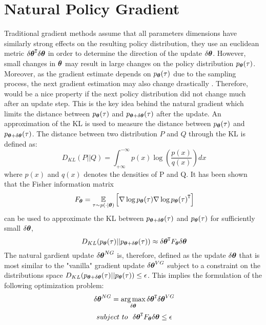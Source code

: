 \section{Natural Policy Gradient}\label{sec:npg}
Traditional gradient methods assume that all parameters dimensions have similarly strong effects on the resulting policy distribution, \ie they use an euclidean metric $\transpose{\delta\vtheta}\delta\vtheta$ in order to determine the direction of the update $\delta\vtheta$. However, small changes in $\vtheta$ may result in large changes on the policy distribution $p_{\vtheta}(\tau)$. Moreover, as the gradient estimate depends on $p_{\vtheta}(\tau)$ due to the sampling process, the next gradient estimation may also change drastically \citep{deisenroth2013survey}. Therefore, would be a nice property if the next policy distribution did not change much after an update step. This is the key idea behind the natural gradient which limits the distance between $p_{\vtheta}(\tau)$ and $p_{\vtheta+\delta\vtheta}(\tau)$ after the update. An approximation of the \ac{KL} is used to measure the distance between $p_{\vtheta}(\tau)$ and $p_{\vtheta+\delta\vtheta}(\tau)$. The distance between two distribution $P$ and $Q$ through the \acs{KL} is defined as:
\[
\	D_{KL}(P||Q)=\int_{+\infty}^{-\infty}p(x)\log(\frac{p(x)}{q(x)})dx
\]
where $p(x)$ and $q(x)$ denotes the densities of P and Q. It has been shown that the Fisher information matrix
\[
\ F_{\vtheta}=\EVV[\tau \sim p(\cdot|\vtheta)]{\score{\vtheta}{\tau}\transpose{\score{\vtheta}{\tau}}}
\]
can be used to approximate the \acs{KL} between $p_{\vtheta+\delta\vtheta}(\tau)$ and $p_{\vtheta}(\tau)$ for sufficiently small $\delta\vtheta$, \ie
\[
\ D_{KL}(p_{\vtheta}(\tau)||p_{\vtheta+\delta\vtheta}(\tau))\approx\transpose{\delta\vtheta}F_{\vtheta}\delta\vtheta
\]
The natural gardient update $\delta\vtheta^{NG}$ is, therefore, defined as the update $\delta\vtheta$ that is most similar to the "vanilla" gradient update $\delta\vtheta^{VG}$  subject to a constraint  on the distributions space $D_{KL}(p_{\vtheta+\delta\vtheta}(\tau)||p_{\vtheta}(\tau))\le\epsilon$.
This implies the formulation of the following optimization problem:
\[
\ \delta\vtheta^{NG}=\argmax_{\delta\vtheta}\transpose{\delta\vtheta}\delta\vtheta^{VG}
\] 
\[
\ subject~to  ~~\transpose{\delta\vtheta}F_{\vtheta}\delta\vtheta\le\epsilon
\]
